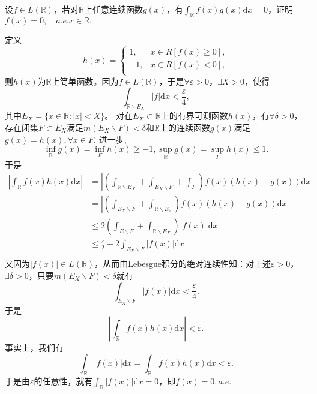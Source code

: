 \begin{exercise}
\hfill\\
设$f\in L(\mathbb{R})$，若对$\mathbb{R}$上任意连续函数$g(x)$，有$\int_{\mathbb{R}}f(x)g(x)\mathrm{d}x=0$，证明$f(x)=0,\quad a.e.x\in\mathbb{R}.$


定义
\begin{equation}
h(x)=
\begin{cases}
1,&x\in R[f(x)\geq0],\\
-1,&x\in R[f(x)<0],\\
\end{cases}
\end{equation}
则$h(x)$为$\mathbb{R}$上简单函数。因为$f\in L(\mathbb{R})$，于是$\forall\varepsilon>0$，$\exists X>0$，使得$$\int_{\mathbb{R}\backslash E_X}|f|\mathrm{d}x<\frac{\varepsilon}{4},$$
其中$E_X=\{x\in\mathbb{R}:|x|<X\}$。
对在$E_X\subset\mathbb{R}$上的有界可测函数$h(x)$，有$\forall\delta>0$，存在闭集$F\subset E_X$满足$m(E_X\backslash F)<\delta$和$\mathbb{R}$上的连续函数$g(x)$满足$g(x)=h(x),\forall x\in F$. 进一步,
$$\inf_{\mathbb{R}}g(x)=\inf_Fh(x)\geq-1,\sup_{\mathbb{R}}g(x)=\sup_Fh(x)\leq1.$$
于是
\begin{align*}
|\int_{\mathbb{R}}f(x)h(x)\mathrm{d}x|&=|(\int_{\mathbb{R}\backslash E_X}+\int_{E_X\backslash F}+\int_F)f(x)(h(x)-g(x))\mathrm{d}x|\\
&=|(\int_{E_X\backslash F}+\int_{\mathbb{R}\backslash E_x})f(x)(h(x)-g(x))\mathrm{d}x|\\
&\leq2(\int_{E\backslash F}+\int_{\mathbb{R}\backslash E_X})|f(x)|\mathrm{d}x\\
&\leq\frac{\varepsilon}{2}+2\int_{E_X\backslash F}|f(x)|\mathrm{d}x\\
\end{align*}
又因为$|f(x)|\in L(\mathbb{R})$，从而由Lebesgue积分的绝对连续性知：对上述$\varepsilon>0$，$\exists\delta>0$，只要$m(E_X\backslash F)<\delta$就有
$$\int_{E_X\backslash F}|f(x)|\mathrm{d}x<\frac{\varepsilon}{4}.$$
于是$$|\int_{\mathbb{R}}f(x)h(x)\mathrm{d}x|<\varepsilon.$$
事实上，我们有$$\int_{\mathbb{R}}|f(x)|\mathrm{d}x=\int_{\mathbb{R}}f(x)h(x)\mathrm{d}x<\varepsilon.$$
于是由$\varepsilon$的任意性，就有$\int_{\mathbb{R}}|f(x)|\mathrm{d}x=0$，即$f(x)=0,a.e.$
\end{exercise}


